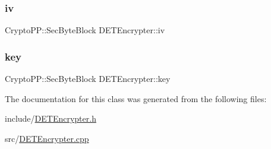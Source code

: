 \subsubsection{\texorpdfstring{iv}{iv}}
{\footnotesize\ttfamily Crypto\+P\+P\+::\+Sec\+Byte\+Block D\+E\+T\+Encrypter\+::iv\hspace{0.3cm}{\ttfamily [private]}}

\mbox{\label{classDETEncrypter_a698a78e4f1fb49cf02a005ee7bce6a99}} 
\subsubsection{\texorpdfstring{key}{key}}
{\footnotesize\ttfamily Crypto\+P\+P\+::\+Sec\+Byte\+Block D\+E\+T\+Encrypter\+::key\hspace{0.3cm}{\ttfamily [private]}}



The documentation for this class was generated from the following files\+:\begin{DoxyCompactItemize}
\item 
include/\hyperlink{DETEncrypter_8h}{D\+E\+T\+Encrypter.\+h}\item 
src/\hyperlink{DETEncrypter_8cpp}{D\+E\+T\+Encrypter.\+cpp}\end{DoxyCompactItemize}
